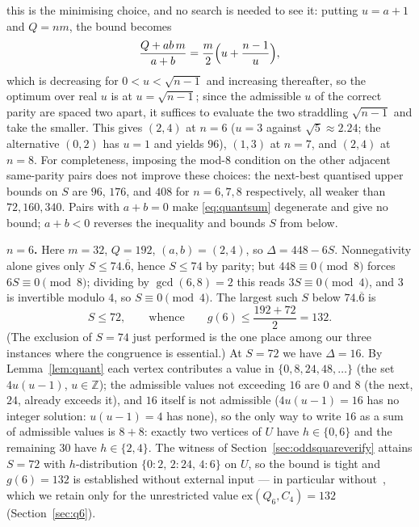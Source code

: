 \documentclass[12pt]{article}
\newcommand{\ex}{\mathrm{ex}}
\begin{document}
this is the minimising choice, and no search is needed to see it: putting
$u=a+1$ and $Q=nm$, the bound becomes
\[
\frac{Q+ab\,m}{a+b}=\frac{m}{2}\Bigl(u+\frac{n-1}{u}\Bigr),
\]
which is decreasing for $0<u<\sqrt{n-1}$ and increasing thereafter, so the
optimum over real $u$ is at $u=\sqrt{n-1}$; since the admissible $u$ of the
correct parity are spaced two apart, it suffices to evaluate the two
straddling $\sqrt{n-1}$ and take the smaller. This gives
$(2,4)$ at $n=6$ ($u=3$ against $\sqrt5\approx2.24$; the alternative $(0,2)$
has $u=1$ and yields $96$), $(1,3)$ at $n=7$, and $(2,4)$ at $n=8$.
For completeness, imposing the mod-$8$ condition on the other adjacent
same-parity pairs does not improve these choices: the next-best quantised
upper bounds on $S$ are $96$, $176$, and $408$ for $n=6,7,8$ respectively,
all weaker than $72,160,340$. Pairs with
$a+b=0$ make \eqref{eq:quantsum} degenerate and give no bound; $a+b<0$
reverses the inequality and bounds $S$ from below.

\textbf{$n=6$.} Here $m=32$, $Q=192$, $(a,b)=(2,4)$, so
$\Delta=448-6S$. Nonnegativity alone gives only
$S\le74.\overline{6}$, hence $S\le74$ by parity; but
$448\equiv0\pmod 8$ forces $6S\equiv0\pmod8$; dividing by
$\gcd(6,8)=2$ this reads $3S\equiv0\pmod4$, and $3$ is invertible
modulo $4$, so $S\equiv0\pmod4$.
The largest such $S$ below $74.\overline{6}$ is
\[
S\le72,
\qquad\text{whence}\qquad
g(6)\le\frac{192+72}{2}=132 .
\]
(The exclusion of $S=74$ just performed is the one place among our three
instances where the congruence is essential.) At $S=72$ we have $\Delta=16$. By Lemma~\ref{lem:quant} each vertex
contributes a value in $\{0,8,24,48,\ldots\}$ (the set $4u(u-1)$,
$u\in\mathbb{Z}$); the admissible values not exceeding $16$ are $0$ and
$8$ (the next, $24$, already exceeds it), and $16$ itself is not
admissible ($4u(u-1)=16$ has no integer solution: $u(u-1)=4$ has none),
so the only way to write $16$ as a sum of admissible values
is $8+8$: exactly two vertices of $U$ have $h\in\{0,6\}$ and the
remaining $30$ have $h\in\{2,4\}$. The witness of
Section~\ref{sec:oddsquareverify} attains $S=72$ with $h$-distribution
$\{0{:}2,\,2{:}24,\,4{:}6\}$ on $U$, so the bound is tight and
$g(6)=132$ is established without external input --- in particular
without~\cite{HN94}, which we retain only for the unrestricted value
$\ex(Q_6,C_4)=132$ (Section~\ref{sec:q6}).
\end{document}
